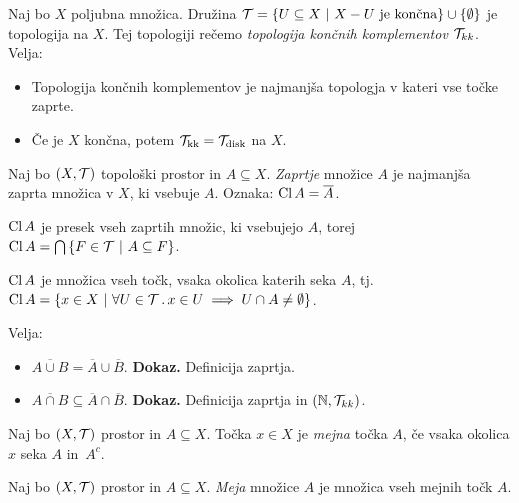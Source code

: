 \begin{primer}
    Naj bo $X$ poljubna množica. Družina $\mathcal{T} = \left\{U \subseteq X \ | \ X - U \text{ je končna}\right\} \cup \left\{\emptyset\right\}$ je topologija na $X$. Tej topologiji rečemo \emph{topologija končnih komplementov $\mathcal{T}_{kk}$}. Velja:

    \begin{itemize}
        \item Topologija končnih komplementov je najmanjša topologja v kateri vse točke zaprte. 
        \item Če je $X$ končna, potem $\mathcal{T}_{\text{kk}}=\mathcal{T}_{\text{disk}}$ na $X$.
    \end{itemize}    
\end{primer}

\begin{definicija}
    Naj bo $(X, \mathcal{T})$ topološki prostor in $A \subseteq X$. \emph{Zaprtje} množice $A$ je najmanjša zaprta množica v $X$, ki vsebuje $A$. Oznaka: $\operatorname{Cl} A = \overline{A}$.
\end{definicija}

\begin{trditev}
    $\operatorname{Cl} A$ je presek vseh zaprtih množic, ki vsebujejo $A$, torej $\operatorname{Cl} A = \bigcap \left\{F \in \mathcal{T} \ | \ A \subseteq F\right\}$.
\end{trditev}

\begin{trditev}
    $\operatorname{Cl} A$ je množica vseh točk, vsaka okolica katerih seka $A$, tj. $\operatorname{Cl} A = \left\{x \in X \ | \ \forall U \in \mathcal{T} \,.\, x \in U \implies U \cap A \neq \emptyset\right\}$.
\end{trditev}

\begin{primer}
    Velja:
    \begin{itemize}
        \item $\overline{A \cup B} = \overline{A} \cup \overline{B}$. \textbf{Dokaz.} Definicija zaprtja.
        \item $\overline{A \cap B} \subseteq \overline{A} \cap \overline{B}$. \textbf{Dokaz.} Definicija zaprtja in $(\mathbb{N}, \mathcal{T}_{kk})$.
    \end{itemize}
\end{primer}

\begin{definicija}
    Naj bo $(X, \mathcal{T})$ prostor in $A \subseteq X$. Točka $x \in X$ je \emph{mejna} točka $A$, če vsaka okolica $x$ seka $A$ in~$A^c$.
\end{definicija}

\begin{definicija}
    Naj bo $(X, \mathcal{T})$ prostor in $A \subseteq X$. \emph{Meja} množice $A$ je množica vseh mejnih točk $A$.
\end{definicija}

